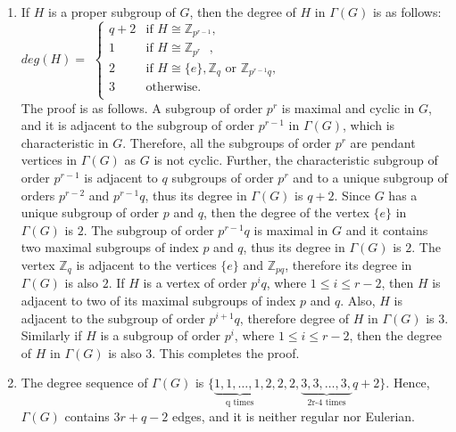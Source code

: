 \documentclass[11pt,twoside]{amsart}
\def \Z {{\mathbb{Z}}}
\def \Ga {{\Gamma }}
\begin{document}
\begin{enumerate}[label={(\arabic*)}]
        \item  If $H$ is a proper subgroup of $G$, then the degree of $H$ in $\Ga (G)$ is as follows:\\
        $deg(H)=$ $\begin{cases}
            q+2 & \mbox{if $H\cong \Z_{p^{r-1}}$},\\
             1 & \mbox{if $H\cong \Z_{p^r}$ },\\
              2 & \mbox{if $H\cong  \{e\}, \Z_{q}$ or $\Z_{p^{r-1}q}$},\\
               3 & \mbox{otherwise}.\\
              \end{cases}$\\
    The proof is as follows. A subgroup of order $p^r$ is maximal and cyclic in $G$, and it is adjacent to the subgroup of order $p^{r-1}$ in $\Ga (G)$, which is characteristic in $G$. Therefore, all the subgroups of order $p^r$ are pendant vertices in $\Ga (G)$ as $G$ is not cyclic. Further, the characteristic subgroup of order $p^{r-1}$ is adjacent to $q$ subgroups of order $p^r$ and to a unique subgroup of orders $p^{r-2}$ and $p^{r-1}q$, thus its degree in $\Ga (G)$ is $q+2$. Since $G$ has a unique subgroup of order $p$ and $q$, then the degree of the vertex $\{e\}$ in $\Ga (G)$ is $2$. The subgroup of order $p^{r-1}q$ is maximal in $G$ and it contains two maximal subgroups of index $p$ and $q$, thus its degree in $\Ga (G)$ is $2$. The vertex $\Z_q$ is adjacent to the vertices $\{e\}$ and $\Z_{pq}$, therefore its degree in $\Ga (G)$ is also $2$. If $H$ is a vertex of order $p^iq$, where $1\leq i \leq {r-2}$, then $H$ is adjacent to two of its maximal subgroups of index $p$ and $q$. Also, $H$ is adjacent to the subgroup of order $p^{i+1}q$, therefore degree of $H$ in $\Ga (G)$ is $3$. Similarly if $H$ is a subgroup of order $p^i$, where $1\leq i \leq {r-2}$, then the degree of $H$ in $\Ga (G)$ is also $3$. This completes the proof.\\
    
    \item The degree sequence of $\Ga (G)$ is $\{
   \underbrace{1,1,\ldots ,1,}_\text{q times}2,2,2,
    \underbrace{3,3,\ldots ,3,}_\text{2r-4 times}q+2
   \}$. Hence, $\Ga (G)$ contains $3r+q-2$ edges, and it is neither regular nor Eulerian.\\
   

\end{enumerate}
\end{document}
